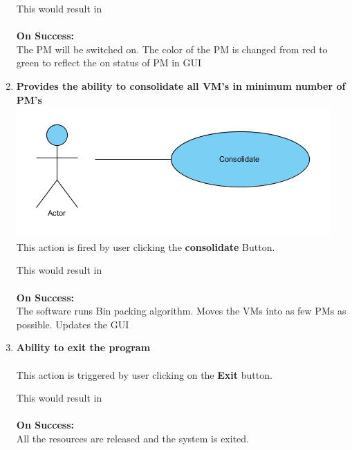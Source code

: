 \documentclass[a4paper,11pt]{article}
\begin{document}
\begin{enumerate}
				This would result in \\\\
				{\bf On Success: }\\
				The PM will be switched on. The color of the PM is changed from red to green to reflect the on 
				status of PM in GUI 
				
				
				
				\item {\bf Provides the ability to consolidate all VM's in minimum number of PM's}\\
				\includegraphics{images/consolidate}
 				\\This action is fired by user clicking the {\bf consolidate} Button. 
								
				This would result in \\\\
				{\bf On Success: }\\
				The software runs Bin packing algorithm. Moves the VMs into as few PMs as possible. Updates the GUI
				\\
				
				
				\item {\bf Ability to exit the program}\\
				\\This action is triggered by user clicking on the \textbf{Exit} button. 
				
				This would result in \\\\
				{\bf On Success: }\\
				All the resources are released and the system is exited.
				
				
				
				

			\end{enumerate}
\end{document}
